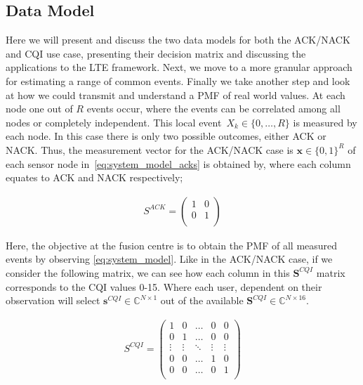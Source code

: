 \documentclass{article}
\begin{document}
\subsection{Data Model}\label{data_models}

Here we will present and discuss the two data models for both the ACK/NACK and CQI use case, presenting their decision matrix and discussing the applications to the LTE framework. Next, we move to a more granular approach for estimating a range of common events. Finally we take another step and look at how we could transmit and understand a PMF of real world values. 
At each node one out of $R$ events occur, where the events can be correlated among all nodes or completely independent. This local event~${X_k \in \{0, \ldots, R\}}$ is measured by each node. In this case there is only two possible outcomes, either ACK or NACK. Thus, the measurement vector for the ACK/NACK case is $\boldsymbol{x} \in \{0,1\}^{R}$ of each sensor node in~\cref{eq:system_model_acks} is obtained by, where each column equates to ACK and NACK respectively;

\begin{align}
    S^{ACK} = 
    \begin{pmatrix}
    1 & 0\\
    0 & 1 \\
    \end{pmatrix}
    \label{fig:sig_mat_ack}
\end{align}


Here, the objective at the fusion centre is to obtain the PMF of all measured events by observing  \eqref{eq:system_model}. Like in the ACK/NACK case, if we consider the following matrix, we can see how each column in this $\textbf{S}^{CQI}$ matrix corresponds to the CQI values 0-15.  Where each user, dependent on their observation will select $\boldsymbol{s}^{CQI} \in \mathbb{C}^{N \times 1}$ out of the available  $\boldsymbol{S}^{CQI} \in \mathbb{C}^{N \times 16}$. 


\begin{align}
    S^{CQI} = 
    \begin{pmatrix}
     1 & 0 & \hdots & 0 & 0\\
    0 & 1 & \hdots & 0 & 0 \\
    \vdots & \vdots & \ddots & \vdots & \vdots \\
    0 & 0 & \hdots & 1 & 0 \\
    0 & 0 & \hdots & 0 & 1 \\
    \end{pmatrix}
    \label{fig:sig_mat_cqi}
\end{align}
\end{document}
